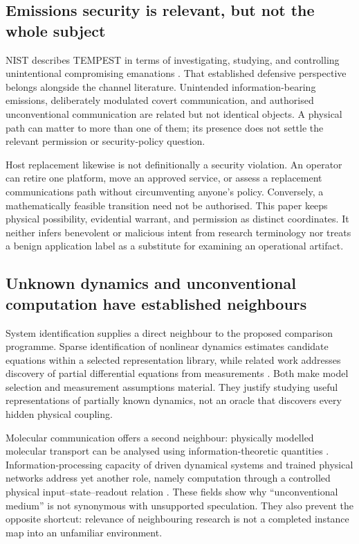 \subsection{Emissions security is relevant, but not the whole subject}
NIST describes TEMPEST in terms of investigating, studying, and controlling unintentional compromising emanations \citep{tempest}. That established defensive perspective belongs alongside the channel literature. Unintended information-bearing emissions, deliberately modulated covert communication, and authorised unconventional communication are related but not identical objects. A physical path can matter to more than one of them; its presence does not settle the relevant permission or security-policy question.

Host replacement likewise is not definitionally a security violation. An operator can retire one platform, move an approved service, or assess a replacement communications path without circumventing anyone's policy. Conversely, a mathematically feasible transition need not be authorised. This paper keeps physical possibility, evidential warrant, and permission as distinct coordinates. It neither infers benevolent or malicious intent from research terminology nor treats a benign application label as a substitute for examining an operational artifact.

\subsection{Unknown dynamics and unconventional computation have established neighbours}
System identification supplies a direct neighbour to the proposed comparison programme. Sparse identification of nonlinear dynamics estimates candidate equations within a selected representation library, while related work addresses discovery of partial differential equations from measurements \citep{sindy,rudy}. Both make model selection and measurement assumptions material. They justify studying useful representations of partially known dynamics, not an oracle that discovers every hidden physical coupling.

Molecular communication offers a second neighbour: physically modelled molecular transport can be analysed using information-theoretic quantities \citep{eckford}. Information-processing capacity of driven dynamical systems and trained physical networks address yet another role, namely computation through a controlled physical input--state--readout relation \citep{dambre,wright}. These fields show why ``unconventional medium'' is not synonymous with unsupported speculation. They also prevent the opposite shortcut: relevance of neighbouring research is not a completed instance map into an unfamiliar environment.

